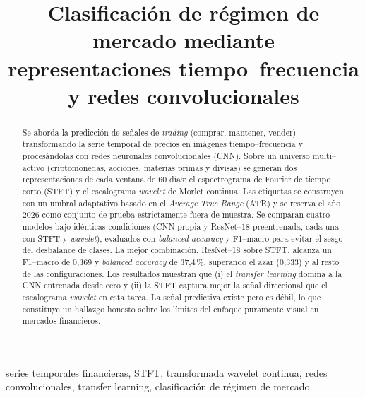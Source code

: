 \documentclass[conference]{IEEEtran}
\begin{document}
\title{Clasificación de régimen de mercado mediante\\
representaciones tiempo--frecuencia y redes convolucionales}

\author{
}

\maketitle

\begin{abstract}
Se aborda la predicción de señales de \emph{trading} (comprar, mantener,
vender) transformando la serie temporal de precios en imágenes
tiempo--frecuencia y procesándolas con redes neuronales convolucionales
(CNN). Sobre un universo multi--activo (criptomonedas, acciones, materias
primas y divisas) se generan dos representaciones de cada ventana de 60
días: el espectrograma de Fourier de tiempo corto (STFT) y el escalograma
\emph{wavelet} de Morlet continua. Las etiquetas se construyen con un umbral
adaptativo basado en el \emph{Average True Range} (ATR) y se reserva el año
2026 como conjunto de prueba estrictamente fuera de muestra. Se comparan
cuatro modelos bajo idénticas condiciones (CNN propia y ResNet--18
preentrenada, cada una con STFT y \emph{wavelet}), evaluados con
\emph{balanced accuracy} y F1--macro para evitar el sesgo del desbalance de
clases. La mejor combinación, ResNet--18 sobre STFT, alcanza un F1--macro de
0,369 y \emph{balanced accuracy} de 37,4\,\%,
superando el azar (0,333) y al resto de las configuraciones. Los resultados
muestran que (i) el \emph{transfer learning} domina a la CNN entrenada desde
cero y (ii) la STFT captura mejor la señal direccional que el escalograma
\emph{wavelet} en esta tarea. La señal predictiva existe pero es débil, lo
que constituye un hallazgo honesto sobre los límites del enfoque puramente
visual en mercados financieros.
\end{abstract}

\begin{IEEEkeywords}
series temporales financieras, STFT, transformada wavelet continua, redes
convolucionales, transfer learning, clasificación de régimen de mercado.
\end{IEEEkeywords}
\end{document}
